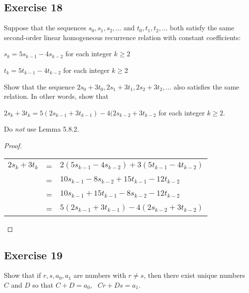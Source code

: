 \documentclass[14pt]{extarticle}
\begin{document}
\subsection{Exercise 18}
Suppose that the sequences \(s_0, s_1, s_2, \ldots\) and \(t_0, t_1, t_2, \ldots\) both satisfy the same second-order
linear homogeneous recurrence relation with constant coefficients:

\(s_k = 5s_{k-1} - 4s_{k-2}\) for each integer \(k \geq 2\)

\(t_k = 5t_{k-1} - 4t_{k-2}\) for each integer \(k \geq 2\)

Show that the sequence \(2s_0 + 3t_0, 2s_1 + 3t_1, 2s_2 + 3t_2, \ldots\) also satisfies the same relation.
In other words, show that

\(2s_k + 3t_k = 5(2s_{k-1} + 3t_{k-1}) - 4(2s_{k-2} + 3t_{k-2}\) for each integer \(k \geq 2\).

Do {\it not} use Lemma 5.8.2.

\begin{proof}
    \begin{tabular}{rcl}
        \(2s_k + 3t_k\) & = & \(2(5s_{k-1} - 4s_{k-2}) + 3(5t_{k-1} - 4t_{k-2})\) \\
                        & = & \(10s_{k-1} - 8s_{k-2} + 15t_{k-1} - 12t_{k-2}\)    \\
                        & = & \(10s_{k-1} + 15t_{k-1} - 8s_{k-2} - 12t_{k-2}\)    \\
                        & = & \(5(2s_{k-1} + 3t_{k-1}) - 4(2s_{k-2} + 3t_{k-2})\)
    \end{tabular}
\end{proof}

\subsection{Exercise 19}
Show that if \(r, s, a_0, a_1\) are numbers with \(r \neq s\), then there exist unique numbers $C$ and $D$ so that
\(C + D = a_0, \,\,\,\, Cr + Ds = a_1\).
\end{document}
